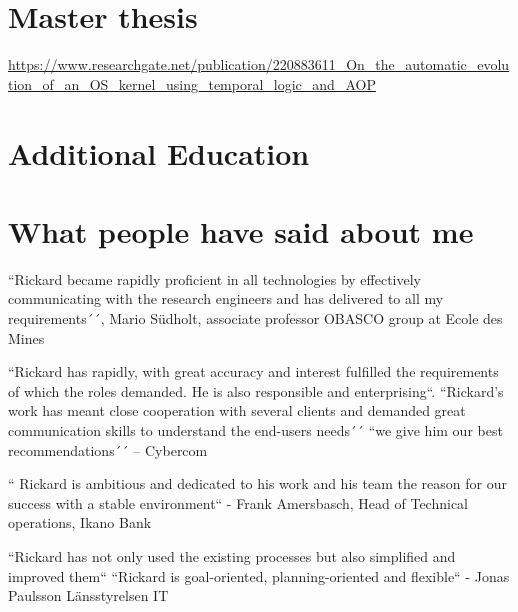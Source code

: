 \documentclass[11pt,a4paper,sans]{moderncv}
\begin{document}
{\section{Master thesis}
\url{https://www.researchgate.net/publication/220883611\_On_the_automatic_evolution_of_an_OS_kernel_using_temporal_logic_and_AOP}


\section{Additional Education}


\section{What people have said about me}
\large 

\begin{quotelist}
    \item
    ``Rickard became rapidly proficient in all technologies by effectively communicating with the research engineers and has delivered to all my requirements´´,
      Mario Südholt, associate professor OBASCO group at Ecole des Mines 
\item
        ``Rickard has rapidly, with great accuracy and interest fulfilled the requirements of which the roles demanded.  He is also responsible and enterprising``. ``Rickard’s work has meant close cooperation with several clients and demanded great communication skills to understand the end-users needs´´ 
        ``we give him our best recommendations´´ – Cybercom 
\item     
        `` Rickard is ambitious and dedicated to his work and his team the reason for our success with a stable environment``  - Frank Amersbasch, Head of Technical operations, Ikano Bank 
\item  ``Rickard has not only used the existing processes but also simplified and improved them`` ``Rickard is goal-oriented, planning-oriented and flexible``  - Jonas Paulsson Länsstyrelsen IT 
       

\end{quotelist}}
\end{document}
